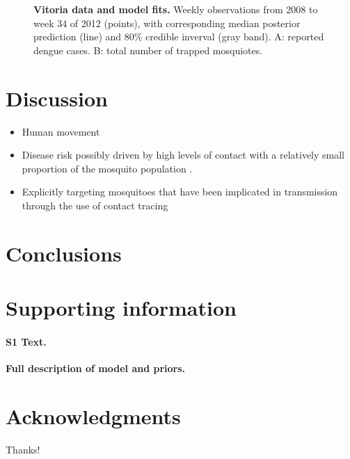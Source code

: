 \documentclass[10pt,letterpaper]{article}
\begin{document}
\begin{figure}[!h]
\caption{{\bf Vitoria data and model fits.}
Weekly observations from 2008 to week 34 of 2012 (points), with corresponding median posterior prediction (line) and 80\% credible inverval (gray band). A: reported dengue cases. B: total number of trapped mosquiotes.
}
\label{timeseries}
\end{figure}


\section*{Discussion}

\begin{itemize}
\item Human movement \cite{Adams2009, Cosner2009a, Stoddard2009, Dalziel2013}
\item Disease risk possibly driven by high levels of contact with a relatively small proportion of the mosquito population \cite{Canyon1999}.
\item Explicitly targeting mosquitoes that have been implicated in transmission through the use of contact tracing \cite{Vazquez-Prokopec2017}
\end{itemize}

\section*{Conclusions}

\section*{Supporting information}

\paragraph*{S1 Text.}
\label{S1_Diag}
{\bf Full description of model and priors.}

\section*{Acknowledgments}

Thanks!

\nolinenumbers

%
%
% 



\end{document}
